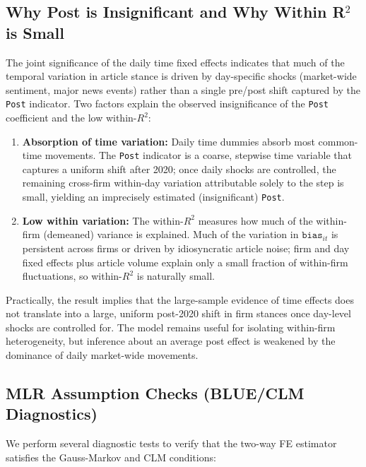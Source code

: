 \documentclass[11pt]{article}
\begin{document}
\subsection*{Why Post is Insignificant and Why Within R$^2$ is Small}
The joint significance of the daily time fixed effects indicates that much of the temporal variation in article stance is driven by day-specific shocks (market-wide sentiment, major news events) rather than a single pre/post shift captured by the \texttt{Post} indicator. Two factors explain the observed insignificance of the \texttt{Post} coefficient and the low within-$R^2$:
\begin{enumerate}[leftmargin=1.5em]
\item \textbf{Absorption of time variation:} Daily time dummies absorb most common-time movements. The \texttt{Post} indicator is a coarse, stepwise time variable that captures a uniform shift after 2020; once daily shocks are controlled, the remaining cross-firm within-day variation attributable solely to the step is small, yielding an imprecisely estimated (insignificant) \texttt{Post}.
\item \textbf{Low within variation:} The within-$R^2$ measures how much of the within-firm (demeaned) variance is explained. Much of the variation in $\texttt{bias}_{it}$ is persistent across firms or driven by idiosyncratic article noise; firm and day fixed effects plus article volume explain only a small fraction of within-firm fluctuations, so within-$R^2$ is naturally small.
\end{enumerate}

Practically, the result implies that the large-sample evidence of time effects does not translate into a large, uniform post-2020 shift in firm stances once day-level shocks are controlled for. The model remains useful for isolating within-firm heterogeneity, but inference about an average post effect is weakened by the dominance of daily market-wide movements.

\subsection*{MLR Assumption Checks (BLUE/CLM Diagnostics)}
We perform several diagnostic tests to verify that the two-way FE estimator satisfies the Gauss-Markov and CLM conditions:
\end{document}

